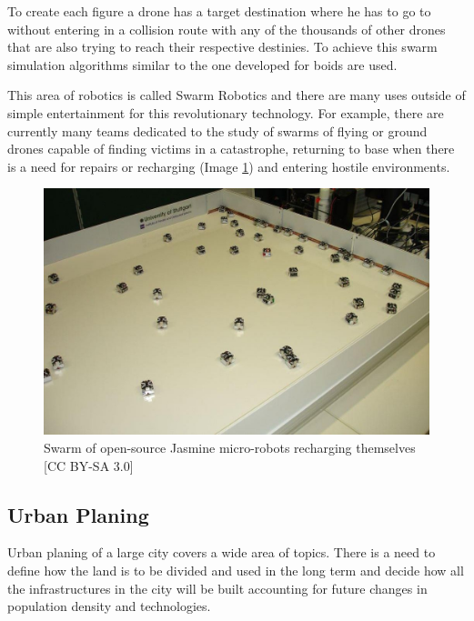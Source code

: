 \documentclass[sigconf]{acmart}
\begin{document}
To create each figure a drone has a target destination where he has to go to without entering in a collision route
with any of the thousands of other drones that are also trying to reach their respective destinies. To achieve this
swarm simulation algorithms similar to the one developed for boids are used.

This area of robotics is called Swarm Robotics and there are many uses outside of simple entertainment for this
revolutionary technology. For example, there are currently many teams dedicated to the study of swarms
of flying or ground drones capable of finding victims in a catastrophe\cite{2014outdoor}, returning to base when there
is a need for repairs or recharging (Image \ref{fig:recharging}) and entering hostile environments.

\begin{figure}[h]
  \centering
  \includegraphics[width=\linewidth]{images/RechargingSwarm.jpg}
  \caption{Swarm of open-source Jasmine micro-robots recharging themselves [CC BY-SA 3.0]}
  \label{fig:recharging}
\end{figure}

\subsection{Urban Planing}

Urban planing of a large city covers a wide area of topics. There is a need to define how the land
is to be divided and used in the long term and decide how all the infrastructures in the city will
be built accounting for future changes in population density and technologies.
\end{document}
